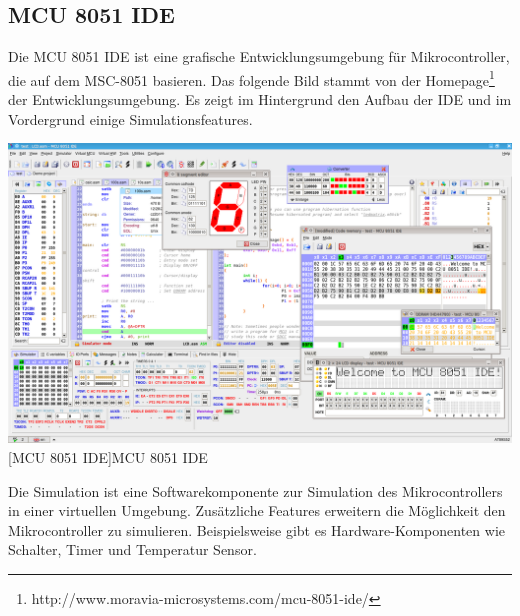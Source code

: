 	

\subsection{MCU 8051 IDE}
	Die MCU 8051 IDE ist eine grafische Entwicklungsumgebung für Mikrocontroller, die auf dem MSC-8051 basieren. Das folgende Bild stammt von der Homepage\footnote{http://www.moravia-microsystems.com/mcu-8051-ide/} der Entwicklungsumgebung. Es zeigt im Hintergrund den Aufbau der IDE und im Vordergrund einige Simulationsfeatures. 

	\begin{center}
		\includegraphics[width=\textwidth]{mcu8051ide.png}
		[MCU 8051 IDE]{MCU 8051 IDE} 
	\end{center}
	
	Die Simulation ist eine Softwarekomponente zur Simulation des Mikrocontrollers in einer virtuellen Umgebung. Zusätzliche Features erweitern die Möglichkeit den Mikrocontroller zu simulieren. Beispielsweise gibt es Hardware-Komponenten wie Schalter, Timer und Temperatur Sensor.